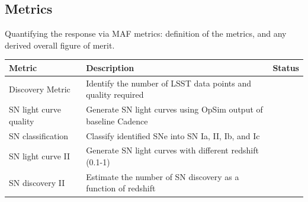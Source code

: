 






\subsection{Metrics}
\label{sec:keyword:metrics}

Quantifying the response via MAF metrics: definition of the metrics,
and any derived overall figure of merit.
\label{sec:keyword:metrics}

\begin{center}
\begin{tabular}{| p{5cm} |p{10cm} |p{2cm}}
\hline Metric & Description & Status\\
\hline
Discovery Metric &  Identify the number of LSST data points and quality required & \\
SN light curve quality & Generate SN light curves using OpSim output of baseline Cadence &\\
SN classification & Classify identified SNe into SN Ia, II, Ib, and Ic & \\
SN light curve II & Generate SN light curves with different redshift (0.1-1) &\\
SN discovery II &  Estimate the number of SN discovery as a function of redshift & \\
\hline \end{tabular}
 \end{center}


